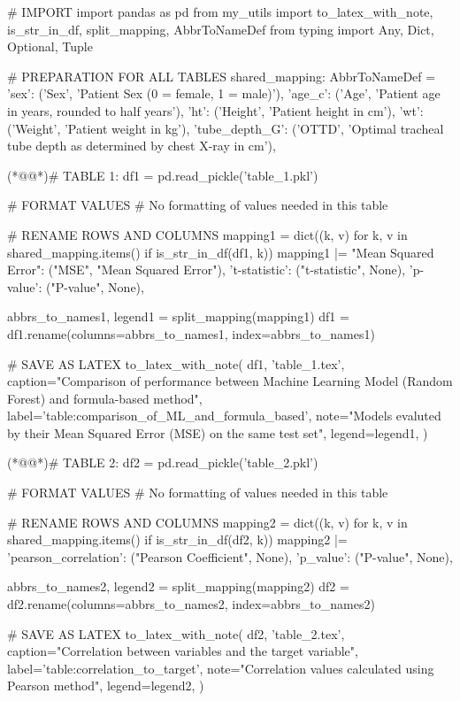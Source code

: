 \documentclass[11pt]{article}
\begin{document}
\begin{python}

# IMPORT
import pandas as pd
from my_utils import to_latex_with_note, is_str_in_df, split_mapping, AbbrToNameDef
from typing import Any, Dict, Optional, Tuple

# PREPARATION FOR ALL TABLES
shared_mapping: AbbrToNameDef = {
    'sex': ('Sex', 'Patient Sex (0 = female, 1 = male)'),
    'age_c': ('Age', 'Patient age in years, rounded to half years'),
    'ht': ('Height', 'Patient height in cm'),
    'wt': ('Weight', 'Patient weight in kg'),
    'tube_depth_G': ('OTTD', 'Optimal tracheal tube depth as determined by chest X-ray in cm'),
}

(*@@*)# TABLE 1:
df1 = pd.read_pickle('table_1.pkl')

# FORMAT VALUES 
# No formatting of values needed in this table

# RENAME ROWS AND COLUMNS 
mapping1 = dict((k, v) for k, v in shared_mapping.items() if is_str_in_df(df1, k)) 
mapping1 |= {
    "Mean Squared Error": ("MSE", "Mean Squared Error"),
    't-statistic': ("t-statistic", None),
    'p-value': ("P-value", None),
}

abbrs_to_names1, legend1 = split_mapping(mapping1)
df1 = df1.rename(columns=abbrs_to_names1, index=abbrs_to_names1)

# SAVE AS LATEX
to_latex_with_note(
    df1, 'table_1.tex',
    caption="Comparison of performance between Machine Learning Model (Random Forest) and formula-based method", 
    label='table:comparison_of_ML_and_formula_based',
    note="Models evaluted by their Mean Squared Error (MSE) on the same test set",
    legend=legend1,
)


(*@@*)# TABLE 2:
df2 = pd.read_pickle('table_2.pkl')

# FORMAT VALUES 
# No formatting of values needed in this table

# RENAME ROWS AND COLUMNS 
mapping2 = dict((k, v) for k, v in shared_mapping.items() if is_str_in_df(df2, k)) 
mapping2 |= {
    'pearson_correlation': ("Pearson Coefficient", None),
    'p_value': ("P-value", None),
}

abbrs_to_names2, legend2 = split_mapping(mapping2)
df2 = df2.rename(columns=abbrs_to_names2, index=abbrs_to_names2)

# SAVE AS LATEX
to_latex_with_note(
    df2, 'table_2.tex',
    caption="Correlation between variables and the target variable", 
    label='table:correlation_to_target',
    note="Correlation values calculated using Pearson method",
    legend=legend2,
)



\end{python}
\end{document}
